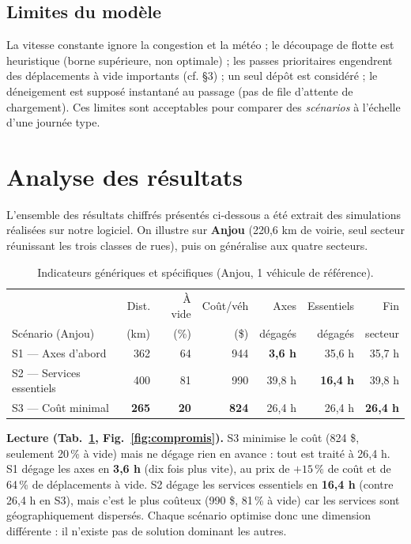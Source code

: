 \documentclass[11pt,a4paper]{article}
\begin{document}
\subsection{Limites du modèle}
La vitesse constante ignore la congestion et la météo ; le découpage de flotte
est heuristique (borne supérieure, non optimale) ; les passes prioritaires
engendrent des déplacements à vide importants (cf. §3) ; un seul dépôt est
considéré ; le déneigement est supposé instantané au passage (pas de file
d'attente de chargement). Ces limites sont acceptables pour comparer des
\emph{scénarios} à l'échelle d'une journée type.

\section{Analyse des résultats}
\label{sec:resultats}
L'ensemble des résultats chiffrés présentés ci-dessous a été extrait des simulations réalisées sur notre logiciel. On illustre sur \textbf{Anjou} (220{,}6 km de voirie, seul secteur réunissant les
trois classes de rues), puis on généralise aux quatre secteurs.

\begin{table}[H]
\centering\small
\begin{tabular}{lrrrrrr}
\toprule
& Dist. & À vide & Coût/véh & Axes & Essentiels & Fin\\
Scénario (Anjou) & (km) & (\%) & (\$) & dégagés & dégagés & secteur\\
\midrule
S1 — Axes d'abord & 362 & 64 & 944 & \textbf{3{,}6 h} & 35{,}6 h & 35{,}7 h\\
S2 — Services essentiels & 400 & 81 & 990 & 39{,}8 h & \textbf{16{,}4 h} & 39{,}8 h\\
S3 — Coût minimal & \textbf{265} & \textbf{20} & \textbf{824} & 26{,}4 h & 26{,}4 h & \textbf{26{,}4 h}\\
\bottomrule
\end{tabular}
\caption{Indicateurs génériques et spécifiques (Anjou, 1 véhicule de référence).}
\label{tab:anjou}
\end{table}

\textbf{Lecture (Tab.~\ref{tab:anjou}, Fig.~\ref{fig:compromis}).} S3 minimise le
coût (824 \$, seulement 20\,\% à vide) mais ne dégage rien en avance : tout est
traité à 26{,}4 h. S1 dégage les axes en \textbf{3{,}6 h} (dix fois plus vite),
au prix de $+15\,\%$ de coût et de 64\,\% de déplacements à vide. S2 dégage les
services essentiels en \textbf{16{,}4 h} (contre 26{,}4 h en S3), mais c'est le
plus coûteux (990 \$, 81\,\% à vide) car les services sont géographiquement
dispersés. Chaque scénario optimise donc une dimension différente : il n'existe
pas de solution dominant les autres.
\end{document}
